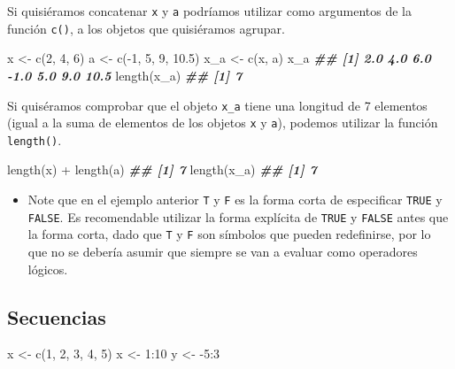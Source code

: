 \documentclass[
]{book}
\newenvironment{Shaded}{\begin{snugshade}}{\end{snugshade}}
\newcommand{\DecValTok}[1]{\textcolor[rgb]{0.00,0.00,0.81}{#1}}
\newcommand{\DocumentationTok}[1]{\textcolor[rgb]{0.56,0.35,0.01}{\textbf{\textit{#1}}}}
\newcommand{\FloatTok}[1]{\textcolor[rgb]{0.00,0.00,0.81}{#1}}
\newcommand{\FunctionTok}[1]{\textcolor[rgb]{0.00,0.00,0.00}{#1}}
\newcommand{\NormalTok}[1]{#1}
\newcommand{\OtherTok}[1]{\textcolor[rgb]{0.56,0.35,0.01}{#1}}
\newcommand{\SpecialCharTok}[1]{\textcolor[rgb]{0.00,0.00,0.00}{#1}}
\newenvironment{rmdblock}[1]
{\begin{shaded*}
		\begin{itemize}
			\renewcommand{\labelitemi}{
				\raisebox{-.7\height}[0pt][0pt]{
					{\setkeys{Gin}{width=3em,keepaspectratio}\texttt{[image: images/\#1]}}
				}
			}
			\item
		}
		{
		\end{itemize}
	\end{shaded*}
}
\newenvironment{rmdnote}
{\begin{rmdblock}{note}}
	{\end{rmdblock}}
\begin{document}
Si quisiéramos concatenar \texttt{x} y \texttt{a} podríamos utilizar como argumentos de la\\
función \texttt{c()}, a los objetos que quisiéramos agrupar.

\begin{Shaded}
\begin{Highlighting}[]
\NormalTok{x }\OtherTok{\textless{}{-}} \FunctionTok{c}\NormalTok{(}\DecValTok{2}\NormalTok{, }\DecValTok{4}\NormalTok{, }\DecValTok{6}\NormalTok{)}
\NormalTok{a }\OtherTok{\textless{}{-}} \FunctionTok{c}\NormalTok{(}\SpecialCharTok{{-}}\DecValTok{1}\NormalTok{, }\DecValTok{5}\NormalTok{, }\DecValTok{9}\NormalTok{, }\FloatTok{10.5}\NormalTok{)}
\NormalTok{x\_a }\OtherTok{\textless{}{-}} \FunctionTok{c}\NormalTok{(x, a)}
\NormalTok{x\_a}
\DocumentationTok{\#\# [1]  2.0  4.0  6.0 {-}1.0  5.0  9.0 10.5}
\FunctionTok{length}\NormalTok{(x\_a)}
\DocumentationTok{\#\# [1] 7}
\end{Highlighting}
\end{Shaded}

Si quiséramos comprobar que el objeto \texttt{x\_a} tiene una longitud de
7 elementos (igual a la suma de elementos de los objetos
\texttt{x} y \texttt{a}), podemos utilizar la función \texttt{length()}.

\begin{Shaded}
\begin{Highlighting}[]
\FunctionTok{length}\NormalTok{(x) }\SpecialCharTok{+} \FunctionTok{length}\NormalTok{(a)}
\DocumentationTok{\#\# [1] 7}
\FunctionTok{length}\NormalTok{(x\_a)}
\DocumentationTok{\#\# [1] 7}
\end{Highlighting}
\end{Shaded}

\begin{rmdnote}
Note que en el ejemplo anterior \texttt{T} y \texttt{F} es la forma
corta de especificar \texttt{TRUE} y \texttt{FALSE}. Es recomendable
utilizar la forma explícita de \texttt{TRUE} y \texttt{FALSE} antes que
la forma corta, dado que \texttt{T} y \texttt{F} son símbolos que pueden
redefinirse, por lo que no se debería asumir que siempre se van a
evaluar como operadores lógicos.
\end{rmdnote}

\hypertarget{secuencias}{%
\subsection{Secuencias}\label{secuencias}}

\begin{Shaded}
\begin{Highlighting}[]
\NormalTok{x }\OtherTok{\textless{}{-}} \FunctionTok{c}\NormalTok{(}\DecValTok{1}\NormalTok{, }\DecValTok{2}\NormalTok{, }\DecValTok{3}\NormalTok{, }\DecValTok{4}\NormalTok{, }\DecValTok{5}\NormalTok{)}
\NormalTok{x }\OtherTok{\textless{}{-}} \DecValTok{1}\SpecialCharTok{:}\DecValTok{10}
\NormalTok{y }\OtherTok{\textless{}{-}} \SpecialCharTok{{-}}\DecValTok{5}\SpecialCharTok{:}\DecValTok{3}
\end{Highlighting}
\end{Shaded}
\end{document}
